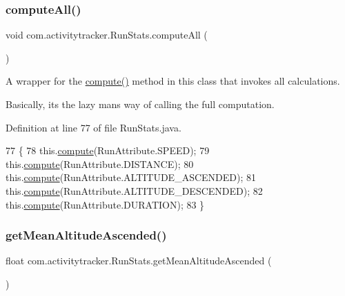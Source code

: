 \subsubsection{\texorpdfstring{compute\+All()}{computeAll()}}
{\footnotesize\ttfamily void com.\+activitytracker.\+Run\+Stats.\+compute\+All (\begin{DoxyParamCaption}{ }\end{DoxyParamCaption})\hspace{0.3cm}{\ttfamily [private]}}

A wrapper for the \mbox{\hyperlink{classcom_1_1activitytracker_1_1_run_stats_ac73cb94cc8ff604fe446d9a327e420cc}{compute()}} method in this class that invokes all calculations.

Basically, it\textquotesingle{}s the lazy man\textquotesingle{}s way of calling the full computation. 

Definition at line 77 of file Run\+Stats.\+java.


\begin{DoxyCode}
77                               \{
78         this.\mbox{\hyperlink{classcom_1_1activitytracker_1_1_run_stats_ac73cb94cc8ff604fe446d9a327e420cc}{compute}}(RunAttribute.SPEED);
79         this.\mbox{\hyperlink{classcom_1_1activitytracker_1_1_run_stats_ac73cb94cc8ff604fe446d9a327e420cc}{compute}}(RunAttribute.DISTANCE);
80         this.\mbox{\hyperlink{classcom_1_1activitytracker_1_1_run_stats_ac73cb94cc8ff604fe446d9a327e420cc}{compute}}(RunAttribute.ALTITUDE\_ASCENDED);
81         this.\mbox{\hyperlink{classcom_1_1activitytracker_1_1_run_stats_ac73cb94cc8ff604fe446d9a327e420cc}{compute}}(RunAttribute.ALTITUDE\_DESCENDED);
82         this.\mbox{\hyperlink{classcom_1_1activitytracker_1_1_run_stats_ac73cb94cc8ff604fe446d9a327e420cc}{compute}}(RunAttribute.DURATION);
83     \}
\end{DoxyCode}
\mbox{\label{classcom_1_1activitytracker_1_1_run_stats_af54051bc8ab944056f90af25d55ac646}} 
\subsubsection{\texorpdfstring{get\+Mean\+Altitude\+Ascended()}{getMeanAltitudeAscended()}}
{\footnotesize\ttfamily float com.\+activitytracker.\+Run\+Stats.\+get\+Mean\+Altitude\+Ascended (\begin{DoxyParamCaption}{ }\end{DoxyParamCaption})}



